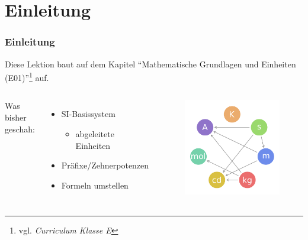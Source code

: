 

\subtitle{Technik Klasse A 01: \\
  Mathematische Grundkenntnisse \\[2em]}
\date{Stand 09.01.2017}


\section{Einleitung}

\begin{frame}
  \frametitle{Einleitung}

  Diese Lektion baut auf dem Kapitel ``Mathematische Grundlagen und Einheiten
  (E01)''\footnote{vgl. \emph{Curriculum Klasse E}\hyperlink{refs}{\cite{curr}}} auf.

  \begin{columns}[c]
    Was bisher geschah: \\[1em]
    \begin{itemize}
      \item SI-Basissystem
        \begin{itemize}
          \item abgeleitete Einheiten
        \end{itemize}
      \item Präfixe/Zehnerpotenzen
      \item Formeln umstellen
    \end{itemize}
    \begin{center}
      \begin{figure}
        \includegraphics[width=.8\textwidth,height=.55\textheight,keepaspectratio]{e01/SI_base_unit.png}
      \end{figure}
    \end{center}
  \end{columns}


\end{frame}
